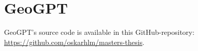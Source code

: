 \chapter{GeoGPT}
\label{cha:architecture}

\begin{comment}
Here you will present the architecture or model that you have chosen and which is (or will be) implemented in your work.
Note that putting algorithms in your report is not always desirable, so in certain cases those might be placed in the appendix.
Code is normally to be avoided in the report itself, but may be included in an appendix or submitted as additional documents.
(The actual code must also be submitted together with the final Master's thesis, but as a zip-file.)

Any off-the-shelf tools and methods that you use in your architecture should have been introduced earlier,
tentatively in the Background chapter (or in the Related Work chapter),
so that they can be referenced here by giving backward pointers to the previous text.

Here, or in a separate chapter (or possibly in the Background chapter or in the Experimental Setup),
you should also discuss the data that you use in your experiments (see Chapter~\ref{cha:data}).

Clearly, a figure showing the architecture is a must, such as Figure~\ref{fig:Architecture}.
Describe all parts of such a figure in reasonable detail in the text, possibly with forward pointers to sections where they will be elaborated on (or backward pointers to sections where tools and methods already have been introduced).
Mention work that motivated your architectural choices, parameter settings, etc.
Those choices should then also be discussed and elaborated on in the Discussion chapter.

\begin{figure}[t!]
    \centering
    \missingfigure{Architecture figure to be added}
    \caption{The missing architecture}
    \label{fig:Architecture}
\end{figure}
\end{comment}

\begin{itshape}
    GeoGPT's source code is available in this GitHub-repository: \url{https://github.com/oskarhlm/masters-thesis}.
\end{itshape}

